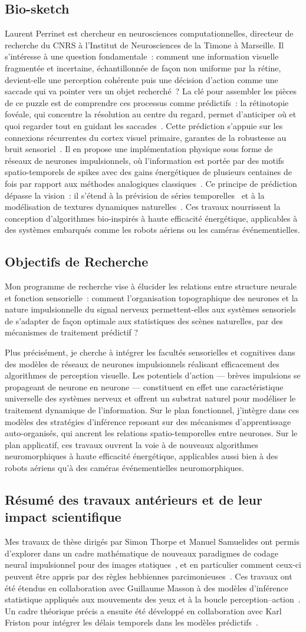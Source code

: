 \documentclass[10pt,french,a4paper,oneside]{article}%
\newcommand{\BioSketch}{Laurent Perrinet est chercheur en neurosciences computationnelles, directeur de recherche du CNRS à l'Institut de Neurosciences de la Timone à Marseille. Il s'intéresse à une question fondamentale~: comment une information visuelle fragmentée et incertaine, échantillonnée de façon non uniforme par la rétine, devient-elle une perception cohérente puis une décision d'action comme une saccade qui va pointer vers un objet recherché~? La clé pour assembler les pièces de ce puzzle est de comprendre ces processus comme prédictifs~: la rétinotopie fovéale, qui concentre la résolution au centre du regard, permet d'anticiper où et quoi regarder tout en guidant les saccades~\citep{Jeremie25}. Cette prédiction s'appuie sur les connexions récurrentes du cortex visuel primaire, garantes de la robustesse au bruit sensoriel~\citep{Ladret23}. Il en propose une implémentation physique sous forme de réseaux de neurones impulsionnels, où l'information est portée par des motifs spatio-temporels de spikes avec des gains énergétiques de plusieurs centaines de fois par rapport aux méthodes analogiques classiques~\citep{Grimaldi23BC}. Ce principe de prédiction dépasse la vision~: il s'étend à la prévision de séries temporelles~\citep{Gunasekaran25} et à la modélisation de textures dynamiques naturelles~\citep{Meso25}. Ces travaux nourrissent la conception d'algorithmes bio-inspirés à haute efficacité énergétique, applicables à des systèmes embarqués comme les robots aériens ou les caméras événementielles.}
\begin{document}
\subsection*{Bio-sketch}
\BioSketch

\subsection*{Objectifs de Recherche}

Mon programme de recherche vise à élucider les relations entre structure neurale et fonction sensorielle~: comment l'organisation topographique des neurones et la nature impulsionnelle du signal nerveux permettent-elles aux systèmes sensoriels de s'adapter de façon optimale aux statistiques des scènes naturelles, par des mécanismes de traitement prédictif ?

Plus précisément, je cherche à intégrer les facultés sensorielles et cognitives dans des modèles de réseaux de neurones impulsionnels réalisant efficacement des algorithmes de perception visuelle. Les potentiels d'action --- brèves impulsions se propageant de neurone en neurone --- constituent en effet une caractéristique universelle des systèmes nerveux et offrent un substrat naturel pour modéliser le traitement dynamique de l'information. Sur le plan fonctionnel, j'intègre dans ces modèles des stratégies d'inférence reposant sur des mécanismes d'apprentissage auto-organisés, qui ancrent les relations spatio-temporelles entre neurones. Sur le plan applicatif, ces travaux ouvrent la voie à de nouveaux algorithmes neuromorphiques à haute efficacité énergétique, applicables aussi bien à des robots aériens qu'à des caméras événementielles neuromorphiques.

\subsection*{Résumé des travaux antérieurs et de leur impact scientifique}

Mes travaux de thèse dirigés par Simon Thorpe et Manuel Samuelides ont permis d'explorer dans un cadre mathématique de nouveaux paradigmes de codage neural impulsionnel pour des images statiques~\citep{Perrinet03ieee}, et en particulier comment ceux-ci peuvent être appris par des règles hebbiennes parcimonieuses~\citep{Perrinet10shl}. Ces travaux ont été étendus en collaboration avec Guillaume Masson à des modèles d'inférence statistique appliqués aux mouvements des yeux et à la boucle perception--action~\citep{Simoncini12}. Un cadre théorique précis a ensuite été développé en collaboration avec Karl Friston pour intégrer les délais temporels dans les modèles prédictifs~\citep{PerrinetAdamsFriston14}.
\end{document}
